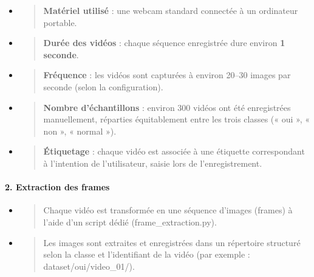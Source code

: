\documentclass[
]{article}
\begin{document}
\begin{itemize}
\item
  \begin{quote}
  \textbf{Matériel utilisé} : une webcam standard connectée à un ordinateur portable.
  \end{quote}
\item
  \begin{quote}
  \textbf{Durée des vidéos} : chaque séquence enregistrée dure environ \textbf{1 seconde}.
  \end{quote}
\item
  \begin{quote}
  \textbf{Fréquence} : les vidéos sont capturées à environ 20--30 images par seconde (selon la configuration).
  \end{quote}
\item
  \begin{quote}
  \textbf{Nombre d'échantillons} : environ 300 vidéos ont été enregistrées manuellement, réparties équitablement entre les trois classes (« oui », « non », « normal »).
  \end{quote}
\item
  \begin{quote}
  \textbf{Étiquetage} : chaque vidéo est associée à une étiquette correspondant à l'intention de l'utilisateur, saisie lors de l'enregistrement.
  \end{quote}
\end{itemize}

\hypertarget{extraction-des-frames}{%
\paragraph{\texorpdfstring{\textbf{2. Extraction des frames}}{2. Extraction des frames}}\label{extraction-des-frames}}

\begin{itemize}
\item
  \begin{quote}
  Chaque vidéo est transformée en une séquence d'images (frames) à l'aide d'un script dédié (frame\_extraction.py).
  \end{quote}
\item
  \begin{quote}
  Les images sont extraites et enregistrées dans un répertoire structuré selon la classe et l'identifiant de la vidéo (par exemple : dataset/oui/video\_01/).
  \end{quote}
\end{itemize}
\end{document}
